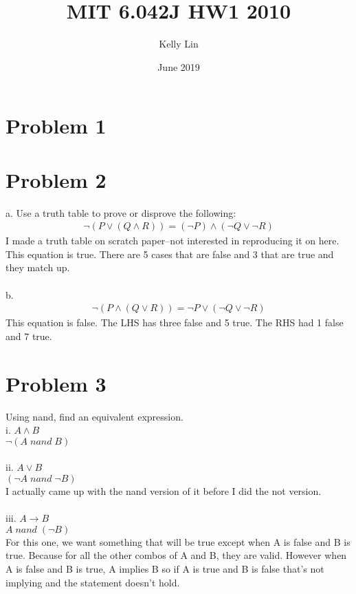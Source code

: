 \documentclass{article}
\title{MIT 6.042J HW1 2010}
\author{Kelly Lin }
\date{June 2019}
\begin{document}
\maketitle

\section{Problem 1}

\section{Problem 2}
a. Use a truth table to prove or disprove the following:
\begin {align*}
\neg (P \vee (Q \wedge R)) = (\neg P) \wedge (\neg Q \vee \neg R)
\end {align*}
I made a truth table on scratch paper--not interested in reproducing it on here. 
This equation is true. There are 5 cases that are false and 3 that are true and they match up. 
\\\\
b.
\begin {align*}
\neg (P \wedge (Q \vee R)) = \neg P \vee (\neg Q \vee \neg R)
\end {align*}
This equation is false. The LHS has three false and 5 true. The RHS had 1 false and 7 true. 
\section{Problem 3}
Using nand, find an equivalent expression.
\\
i. $A \wedge B$
\\
$\neg (A \; nand \; B)$
\\\\
ii. $A \vee B$
\\
$(\neg A \; nand \; \neg B)$
\\
I actually came up with the nand version of it before I did the not version.
\\\\
iii. $A \rightarrow B$
\\
$A \; nand \; (\neg B)$
\\
For this one, we want something that will be true except when A is false and B is true. Because for all the other combos of A and B, they are valid. However when A is false and B is true, A implies B so if A is true and B is false that's not implying and the statement doesn't hold.
\end{document}
